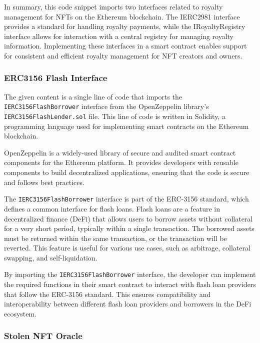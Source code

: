 In summary, this code snippet imports two interfaces related to royalty
management for NFTs on the Ethereum blockchain. The IERC2981 interface
provides a standard for handling royalty payments, while the
IRoyaltyRegistry interface allows for interaction with a central
registry for managing royalty information. Implementing these interfaces
in a smart contract enables support for consistent and efficient royalty
management for NFT creators and owners.

\hypertarget{erc3156-flash-interface}{%
\subsubsection{ERC3156 Flash Interface}\label{erc3156-flash-interface}}

The given content is a single line of code that imports the
\texttt{IERC3156FlashBorrower} interface from the OpenZeppelin library's
\texttt{IERC3156FlashLender.sol} file. This line of code is written in
Solidity, a programming language used for implementing smart contracts
on the Ethereum blockchain.

OpenZeppelin is a widely-used library of secure and audited smart
contract components for the Ethereum platform. It provides developers
with reusable components to build decentralized applications, ensuring
that the code is secure and follows best practices.

The \texttt{IERC3156FlashBorrower} interface is part of the ERC-3156
standard, which defines a common interface for flash loans. Flash loans
are a feature in decentralized finance (DeFi) that allows users to
borrow assets without collateral for a very short period, typically
within a single transaction. The borrowed assets must be returned within
the same transaction, or the transaction will be reverted. This feature
is useful for various use cases, such as arbitrage, collateral swapping,
and self-liquidation.

By importing the \texttt{IERC3156FlashBorrower} interface, the developer
can implement the required functions in their smart contract to interact
with flash loan providers that follow the ERC-3156 standard. This
ensures compatibility and interoperability between different flash loan
providers and borrowers in the DeFi ecosystem.

\hypertarget{stolen-nft-oracle-2}{%
\subsubsection{Stolen NFT Oracle}\label{stolen-nft-oracle-2}}

